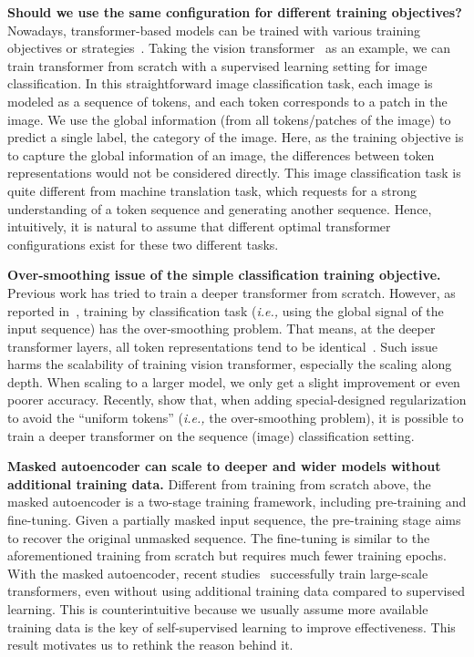 \documentclass{article}
\theoremstyle{plain}
\theoremstyle{definition}
\theoremstyle{remark}
\newcommand{\ie}{\emph{i.e.,}\xspace}
\begin{document}
\textbf{Should we use the same configuration for different training objectives?} Nowadays, transformer-based models can be trained with various training objectives or strategies~\citep{tay2022unifying,tay2022transcending}. Taking the vision transformer~\citep{dosovitskiy2020image} as an example, we can train transformer from scratch with a supervised learning setting for image classification. In this straightforward image classification task, each image is modeled as a sequence of  tokens, and each token corresponds to a patch in the image. We use the  global information (from all tokens/patches of the image) to predict a single label, the category of the image. Here, as the training objective is to capture the global information of an image, the differences between token representations would not be considered directly. This image classification task is quite different from  machine translation task, which requests for a strong understanding of a token sequence and generating another sequence. Hence, intuitively, it is natural to assume that different optimal transformer configurations exist for these two different tasks. 


\textbf{Over-smoothing issue of the simple classification training objective.} Previous work has tried to train a deeper transformer from scratch. However, as reported in~\citep{zhou2021deepvit,gong2021vision}, training by classification task (\ie using the global signal of the input sequence) has the over-smoothing problem. That means, at the deeper transformer layers, all token representations tend to be identical~\citep{Brunner2020On}. Such issue harms the scalability of training vision transformer, especially the scaling along depth. When scaling to a larger model, we only get a slight improvement or even poorer accuracy. Recently, \citet{zhou2021deepvit, gong2021vision} show that, when adding special-designed regularization to avoid the ``uniform tokens'' (\ie the over-smoothing problem), it is possible to train a deeper transformer on the sequence (image) classification setting. 


\textbf{Masked autoencoder can scale to deeper and wider models without additional training data.} Different from training from scratch above, the masked autoencoder is a two-stage training framework, including pre-training and fine-tuning. Given a partially masked input sequence, the pre-training stage aims to recover the original unmasked sequence. The fine-tuning is similar to the aforementioned training from scratch but requires much fewer training epochs. With the masked autoencoder, recent studies~\citep{bao2021beit,he2021masked} successfully train large-scale transformers, even without using additional training data compared to supervised learning. This is counterintuitive because we usually assume more available training data is the key of self-supervised learning to improve effectiveness. 
This result motivates us to rethink the reason behind it. 
\end{document}
